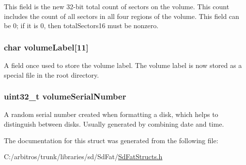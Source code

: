 This field is the new 32-\/bit total count of sectors on the volume. This count includes the count of all sectors in all four regions of the volume. This field can be 0; if it is 0, then total\-Sectors16 must be nonzero. \hypertarget{structfat__boot_a253960050a38d2bfb2f57e86769aca62}{
\subsubsection[{volume\-Label}]{\setlength{\rightskip}{0pt plus 5cm}char volume\-Label\mbox{[}11\mbox{]}}}\label{structfat__boot_a253960050a38d2bfb2f57e86769aca62}
A field once used to store the volume label. The volume label is now stored as a special file in the root directory. \hypertarget{structfat__boot_a7c9ffcee12051cefe1724e8024af25f8}{
\subsubsection[{volume\-Serial\-Number}]{\setlength{\rightskip}{0pt plus 5cm}uint32\-\_\-t volume\-Serial\-Number}}\label{structfat__boot_a7c9ffcee12051cefe1724e8024af25f8}
A random serial number created when formatting a disk, which helps to distinguish between disks. Usually generated by combining date and time. 

The documentation for this struct was generated from the following file\-:\begin{DoxyCompactItemize}
\item 
C\-:/arbitros/trunk/libraries/sd/\-Sd\-Fat/\hyperlink{_sd_fat_structs_8h}{Sd\-Fat\-Structs.\-h}\end{DoxyCompactItemize}

